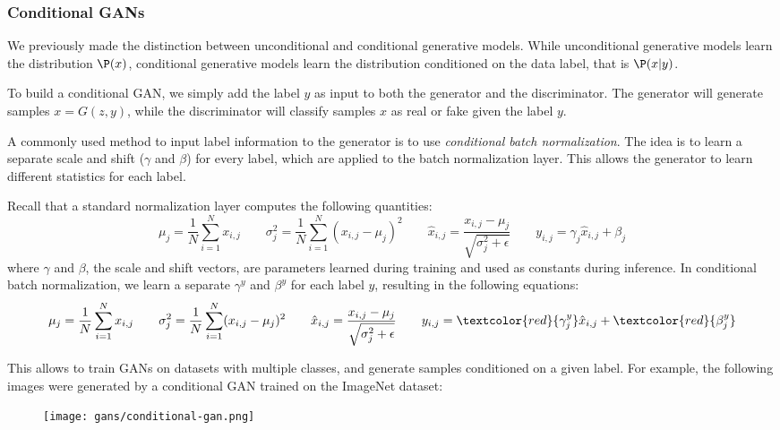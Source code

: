 \subsubsection{Conditional GANs}
We previously made the distinction between unconditional and conditional generative models. While unconditional generative models learn the distribution $\P(x)$, conditional generative models learn the distribution conditioned on the data label, that is $\P(x|y)$.

To build a conditional GAN, we simply add the label $y$ as input to both the generator and the discriminator. The generator will generate samples $x = G(z, y)$, while the discriminator will classify samples $x$ as real or fake given the label $y$.

A commonly used method to input label information to the generator is to use \emph{conditional batch normalization}. The idea is to learn a separate scale and shift ($\gamma$ and $\beta$) for every label, which are applied to the batch normalization layer. This allows the generator to learn different statistics for each label.

Recall that a standard normalization layer computes the following quantities:
\begin{equation*}
    \mu_j = \frac{1}{N}\sum_{i=1}^N x_{i, j} \qquad
    \sigma_j^2 = \frac{1}{N}\sum_{i=1}^N (x_{i,j}-\mu_j)^2 \qquad
    \hat{x}_{i,j} = \frac{x_{i,j}-\mu_j}{\sqrt{\sigma^2_j+\epsilon}} \qquad
    y_{i,j} = \gamma_j\hat{x}_{i,j}+\beta_j
\end{equation*}
where $\gamma$ and $\beta$, the scale and shift vectors, are parameters learned during training and used as constants during inference. In conditional batch normalization, we learn a separate $\gamma^y$ and $\beta^y$ for each label $y$, resulting in the following equations:
\begin{equation*}
    \mu_j = \frac{1}{N}\sum_{i=1}^N x_{i, j} \qquad
    \sigma_j^2 = \frac{1}{N}\sum_{i=1}^N (x_{i,j}-\mu_j)^2 \qquad
    \hat{x}_{i,j} = \frac{x_{i,j}-\mu_j}{\sqrt{\sigma^2_j+\epsilon}} \qquad
    y_{i,j} = \textcolor{red}{\gamma_j^y}\hat{x}_{i,j}+\textcolor{red}{\beta_j^y}
\end{equation*}

This allows to train GANs on datasets with multiple classes, and generate samples conditioned on a given label. For example, the following images were generated by a conditional GAN trained on the ImageNet dataset:
\begin{figure}[H]
    \centering
    \texttt{[image: gans/conditional-gan.png]}
\end{figure}

